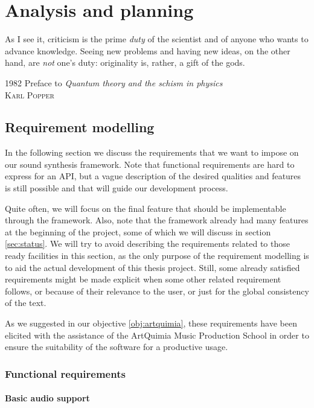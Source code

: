 
\chapter{Analysis and planning}

\epigraph{As I see it, criticism is the prime \emph{duty} of the
  scientist and of anyone who wants to advance knowledge. Seeing new
  problems and having new ideas, on the other hand, are \emph{not}
  one's duty: originality is, rather, a gift of the gods.}{
  1982 Preface to \emph{Quantum theory and the schism in physics}\\
  \textsc{Karl Popper}}

\section{Requirement modelling}
\label{sec:requirements}

In the following section we discuss the
requirements that we want to impose on our sound synthesis
framework. Note that functional requirements are hard to express for
an API, but a vague description of the desired qualities and features
is still possible and that will guide our development process.

Quite often, we will focus on the final feature that should be
implementable through the framework. Also, note that the framework
already had many features at the beginning of the project, some of
which we will discuss in section \ref{sec:status}. We will try to
avoid describing the requirements related to those ready facilities in
this section, as the only purpose of the requirement modelling is to
aid the actual development of this thesis project. Still, some already
satisfied requirements might be made explicit when some other related
requirement follows, or because of their relevance to the user, or
just for the global consistency of the text.

As we suggested in our objective \ref{obj:artquimia}, these
requirements have been elicited with the assistance of the
ArtQuimia Music Production School in order to ensure
the suitability of the software for a productive usage.

\subsection{Functional requirements}

\subsubsection{Basic audio support}

